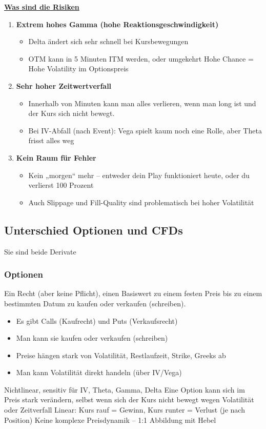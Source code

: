 \textbf{\underline{Was sind die Risiken}}
\begin{enumerate}
  \item \textbf{Extrem hohes Gamma (hohe Reaktionsgeschwindigkeit)}
  \begin{itemize}
    \item Delta ändert sich sehr schnell bei Kursbewegungen
    \item OTM kann in 5 Minuten ITM werden, oder umgekehrt \rightarrow Hohe Chance = Hohe Volatility im Optionspreis
  \end{itemize}
  \item \textbf{Sehr hoher Zeitwertverfall}
  \begin{itemize}
    \item Innerhalb von Minuten kann man alles verlieren, wenn man long ist und der Kurs sich nicht bewegt.
    \item Bei IV-Abfall (nach Event): Vega spielt kaum noch eine Rolle, aber Theta frisst alles weg
  \end{itemize}
  \item \textbf{Kein Raum für Fehler}
  \begin{itemize}
    \item Kein „morgen“ mehr – entweder dein Play funktioniert heute, oder du verlierst 100 Prozent
    \item Auch Slippage und Fill-Quality sind problematisch bei hoher Volatilität
  \end{itemize}
\end{enumerate}

\subsection{Unterschied Optionen und CFDs}
Sie sind beide Derivate
\subsubsection{Optionen}
Ein Recht (aber keine Pflicht), einen Basiswert zu einem festen Preis bis zu einem bestimmten Datum zu kaufen oder verkaufen (schreiben).
\begin{itemize}
  \item Es gibt Calls (Kaufrecht) und Puts (Verkaufsrecht)
  \item Man kann sie kaufen oder verkaufen (schreiben)
  \item Preise hängen stark von Volatilität, Restlaufzeit, Strike, Greeks ab
  \item Man kann Volatilität direkt handeln (über IV/Vega)
\end{itemize}
Nichtlinear, sensitiv für IV, Theta, Gamma, Delta
Eine Option kann sich im Preis stark verändern, selbst wenn sich der Kurs nicht bewegt 
\rightarrow wegen Volatilität oder Zeitverfall
Linear: Kurs rauf = Gewinn, Kurs runter = Verlust (je nach Position)
Keine komplexe Preisdynamik – 1:1 Abbildung mit Hebel

